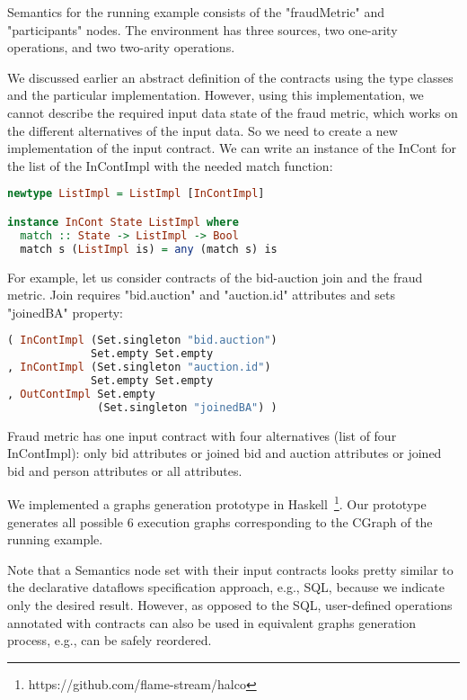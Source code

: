Semantics for the running example consists of the "fraudMetric" and "participants" nodes.
The environment has three sources, two one-arity operations, and two two-arity operations.

We discussed earlier an abstract definition of the contracts using the type classes and the particular implementation. 
However, using this implementation, we cannot describe the required input data state of the fraud metric, which works on the different alternatives of the input data.
So we need to create a new implementation of the input contract.
We can write an instance of the InCont for the list of the InContImpl with the needed match function:

\begin{lstlisting}[language=Haskell]
newtype ListImpl = ListImpl [InContImpl]

instance InCont State ListImpl where
  match :: State -> ListImpl -> Bool
  match s (ListImpl is) = any (match s) is
\end{lstlisting}

For example, let us consider contracts of the bid-auction join and the fraud metric.
Join requires "bid.auction" and "auction.id" attributes and sets "joinedBA" property:
\begin{lstlisting}[language=Haskell]
( InContImpl (Set.singleton "bid.auction")
             Set.empty Set.empty
, InContImpl (Set.singleton "auction.id")
             Set.empty Set.empty
, OutContImpl Set.empty
              (Set.singleton "joinedBA") )
\end{lstlisting}

Fraud metric has one input contract with four alternatives (list of four InContImpl):
only bid attributes
or joined bid and auction attributes
or joined bid and person attributes
or all attributes.

We implemented a graphs generation prototype in Haskell~\footnote{https://github.com/flame-stream/halco}.
Our prototype generates all possible 6 execution graphs corresponding to the CGraph of the running example.

Note that a Semantics node set with their input contracts looks pretty similar to the declarative dataflows specification approach, e.g., SQL, because we indicate only the desired result.
However, as opposed to the SQL, user-defined operations annotated with contracts can also be used in equivalent graphs generation process, e.g., can be safely reordered.
